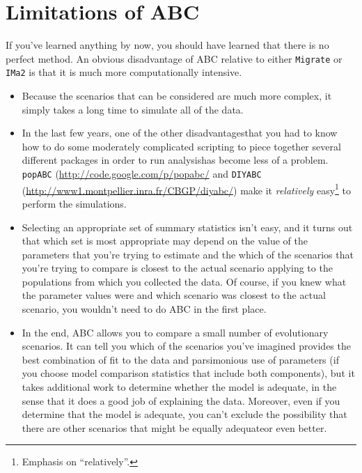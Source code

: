 \section*{Limitations of ABC}

If you've learned anything by now, you should have learned that there
is no perfect method. An obvious disadvantage of ABC relative to
either {\tt Migrate} or {\tt IMa2} is that it is much more
computationally intensive. 

\begin{itemize}

\item Because the scenarios that can be considered are much more
  complex, it simply takes a long time to simulate all of the data. 

\item In the last few years, one of the other disadvantages{\dash}that
  you had to know how to do some moderately complicated scripting to
  piece together several different packages in order to run
  analysis{\dash}has become less of a problem. {\tt popABC}
  (\url{http://code.google.com/p/popabc/} and {\tt DIYABC}
  (\url{http://www1.montpellier.inra.fr/CBGP/diyabc/}) make it {\it
    relatively\/} easy\footnote{Emphasis on ``relatively''.} to
  perform the simulations.

\item Selecting an appropriate set of summary statistics isn't easy,
  and it turns out that which set is most appropriate may depend on
  the value of the parameters that you're trying to estimate and the
  which of the scenarios that you're trying to compare is closest to
  the actual scenario applying to the populations from which you
  collected the data. Of course, if you knew what the parameter values
  were and which scenario was closest to the actual scenario, you
  wouldn't need to do ABC in the first place.

\item In the end, ABC allows you to compare a small number of
  evolutionary scenarios. It can tell you which of the scenarios
  you've imagined provides the best combination of fit to the data and
  parsimonious use of parameters (if you choose model comparison
  statistics that include both components), but it takes additional
  work to determine whether the model is adequate, in the sense that
  it does a good job of explaining the data. Moreover, even if you
  determine that the model is adequate, you can't exclude the
  possibility that there are other scenarios that might be equally
  adequate{\dash}or even better.

\end{itemize}

\vfil

